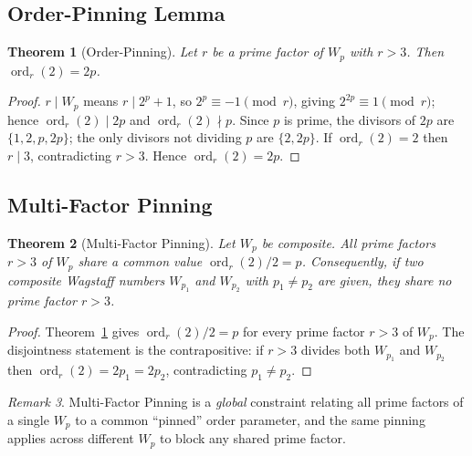 \documentclass[12pt]{article}
\theoremstyle{plain}
\newtheorem{theorem}{Theorem}[section]
\theoremstyle{definition}
\theoremstyle{remark}
\newtheorem{remark}[theorem]{Remark}
\begin{document}
\subsection{Order-Pinning Lemma}

\begin{theorem}[Order-Pinning]\label{thm:order-pinning}
Let \(r\) be a prime factor of \(W_p\) with \(r > 3\). Then
\(\operatorname{ord}_r(2) = 2p\).
\end{theorem}

\begin{proof}
\(r \mid W_p\) means \(r \mid 2^p + 1\), so \(2^p \equiv -1
\pmod r\), giving \(2^{2p} \equiv 1 \pmod r\); hence
\(\operatorname{ord}_r(2) \mid 2p\) and
\(\operatorname{ord}_r(2) \nmid p\). Since \(p\) is prime, the
divisors of \(2p\) are \(\{1, 2, p, 2p\}\); the only divisors not
dividing \(p\) are \(\{2, 2p\}\). If
\(\operatorname{ord}_r(2) = 2\) then \(r \mid 3\), contradicting
\(r > 3\). Hence \(\operatorname{ord}_r(2) = 2p\).
\end{proof}

\subsection{Multi-Factor Pinning}

\begin{theorem}[Multi-Factor Pinning]\label{thm:multi-factor-pinning}
Let \(W_p\) be composite. All prime factors \(r > 3\) of \(W_p\)
share a common value \(\operatorname{ord}_r(2)/2 = p\).
Consequently, if two composite Wagstaff numbers \(W_{p_1}\) and
\(W_{p_2}\) with \(p_1 \neq p_2\) are given, they share no prime
factor \(r > 3\).
\end{theorem}

\begin{proof}
Theorem~\ref{thm:order-pinning} gives
\(\operatorname{ord}_r(2)/2 = p\) for every prime factor \(r > 3\)
of \(W_p\). The disjointness statement is the contrapositive: if
\(r > 3\) divides both \(W_{p_1}\) and \(W_{p_2}\) then
\(\operatorname{ord}_r(2) = 2 p_1 = 2 p_2\), contradicting
\(p_1 \neq p_2\).
\end{proof}

\begin{remark}
Multi-Factor Pinning is a \emph{global} constraint relating all
prime factors of a single \(W_p\) to a common ``pinned'' order
parameter, and the same pinning applies across different \(W_p\)
to block any shared prime factor.
\end{remark}
\end{document}
